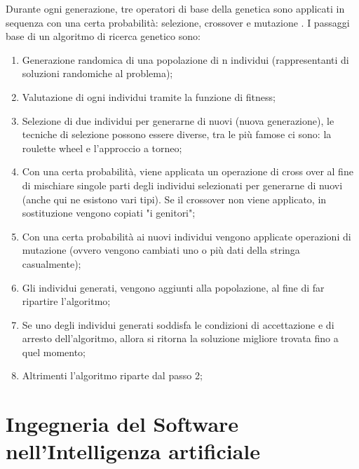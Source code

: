 Durante ogni generazione, tre operatori di base della genetica sono applicati in sequenza con una certa probabilità: selezione, crossover e mutazione \cite{geneticalgotihm} . I passaggi base di un algoritmo di ricerca genetico sono:
\begin{enumerate}
    \item Generazione randomica di una popolazione di n individui (rappresentanti di soluzioni randomiche al problema);
    \item Valutazione di ogni individui tramite la funzione di fitness;
    \item Selezione di due individui per generarne di nuovi (nuova generazione), le tecniche di selezione possono essere diverse, tra le più famose ci sono: la roulette wheel e l'approccio a torneo;
    \item Con una certa probabilità, viene applicata un operazione di cross over al fine di mischiare singole parti degli individui selezionati per generarne di nuovi (anche qui ne esistono vari tipi). Se il crossover non viene applicato, in sostituzione vengono copiati "i genitori";
    \item Con una certa  probabilità ai nuovi individui vengono applicate operazioni di mutazione (ovvero vengono cambiati uno o più dati della stringa casualmente);
    \item Gli individui generati, vengono aggiunti alla popolazione, al fine di far ripartire l'algoritmo;
    \item Se uno degli individui generati soddisfa le condizioni di accettazione e di arresto dell'algoritmo, allora si ritorna la soluzione migliore trovata fino a quel momento;
    \item Altrimenti l'algoritmo riparte dal passo 2;
    
\end{enumerate}


\section{Ingegneria del Software nell'Intelligenza artificiale}

